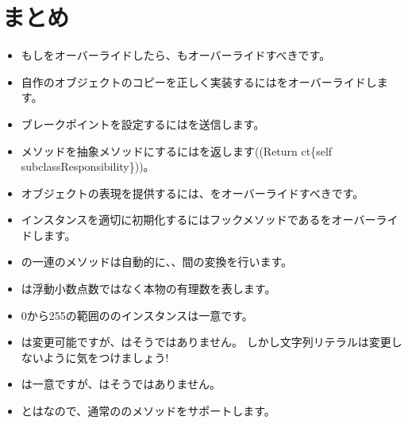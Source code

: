 \documentclass[a4paper,10pt,twoside]{book}
\begin{document}

\section{まとめ}

\begin{itemize}

  \item もし\ct{=}をオーバーライドしたら、もオーバーライドすべきです。

  \item 自作のオブジェクトのコピーを正しく実装するにはをオーバーライドします。

  \item ブレークポイントを設定するにはを送信します。

  \item メソッドを抽象メソッドにするにはを返します((Return ct\{self subclassResponsibility\}))。

  \item オブジェクトの表現を提供するには、をオーバーライドすべきです。

  \item インスタンスを適切に初期化するにはフックメソッドであるをオーバーライドします。

  \item {}の一連のメソッドは自動的に、、間の変換を行います。

  \item {}は浮動小数点数ではなく本物の有理数を表します。

  \item 0から255の範囲ののインスタンスは一意です。

  \item {}は変更可能ですが、はそうではありません。
  しかし文字列リテラルは変更しないように気をつけましょう!

  \item {}は一意ですが、はそうではありません。

  \item {}とはなので、通常ののメソッドをサポートします。

\end{itemize}

\ifx\wholebook\relax\else
   
   
\end{document}
